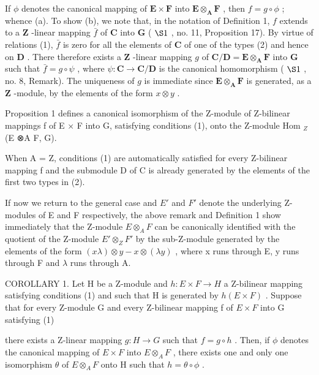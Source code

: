 If \(\phi\) denotes the canonical mapping of \(\mathbf{E} \times \mathbf{F}\) into \(\mathbf{E} \otimes_{\mathbf{A}} \mathbf{F}\) , then \(f = g \circ \phi\) ; whence (a). To show (b), we note that, in the notation of Definition 1, \(f\) extends to a \(\mathbf{Z}\) -linear mapping \(\bar{f}\) of \(\mathbf{C}\) into \(\mathbf{G}\) ( \(\S 1\) , no. 11, Proposition 17). By virtue of relations (1), \(\bar{f}\) is zero for all the elements of \(\mathbf{C}\) of one of the types (2) and hence on \(\mathbf{D}\) . There therefore exists a \(\mathbf{Z}\) -linear mapping \(g\) of \(\mathbf{C} / \mathbf{D} = \mathbf{E} \otimes_{\mathbf{A}} \mathbf{F}\) into \(\mathbf{G}\) such that \(\bar{f} = g \circ \psi\) , where \(\psi: \mathbf{C} \to \mathbf{C} / \mathbf{D}\) is the canonical homomorphism ( \(\S 1\) , no. 8, Remark). The uniqueness of \(g\) is immediate since \(\mathbf{E} \otimes_{\mathbf{A}} \mathbf{F}\) is generated, as a \(\mathbf{Z}\) -module, by the elements of the form \(x \otimes y\) .

Proposition 1 defines a canonical isomorphism of the Z-module of Z-bilinear mappings f of E × F into G, satisfying conditions (1), onto the Z-module Hom \(_{Z}\) (E ⊗A F, G).

When A = Z, conditions (1) are automatically satisfied for every Z-bilinear mapping f and the submodule D of C is already generated by the elements of the first two types in (2).

If now we return to the general case and \(E'\) and \(F'\) denote the underlying Z-modules of E and F respectively, the above remark and Definition 1 show immediately that the Z-module \(E \otimes_{A} F\) can be canonically identified with the quotient of the Z-module \(E' \otimes_{Z} F'\) by the sub-Z-module generated by the elements of the form \((x\lambda) \otimes y - x \otimes (\lambda y)\) , where x runs through E, y runs through F and \(\lambda\) runs through A.

COROLLARY 1. Let H be a Z-module and \(h:E \times F \rightarrow H\) a Z-bilinear mapping satisfying conditions (1) and such that H is generated by \(h(E \times F)\) . Suppose that for every Z-module G and every Z-bilinear mapping f of \(E \times F\) into G satisfying (1)

there exists a Z-linear mapping \(g:H \to G\) such that \(f = g \circ h\) . Then, if \(\phi\) denotes the canonical mapping of \(E \times F\) into \(E \otimes_{A} F\) , there exists one and only one isomorphism \(\theta\) of \(E \otimes_{A} F\) onto H such that \(h = \theta \circ \phi\) .

